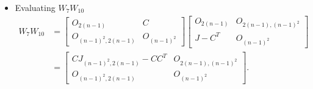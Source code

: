 \begin{itemize}
    \item Evaluating $W_7W_{10}$
    \begin{align*}
        W_7W_{10}
        &= \begin{bmatrix}
            O_{2(n-1)} & C \\
            O_{(n-1)^2, 2(n-1)} & O_{(n-1)^2}
        \end{bmatrix}\begin{bmatrix}
            O_{2(n-1)} & O_{2(n-1),(n-1)^2} \\
            J-C^T & O_{(n-1)^2}
        \end{bmatrix}\\
        &= \begin{bmatrix}
            CJ_{(n-1)^2,2(n-1)} - CC^T & O_{2(n-1),(n-1)^2} \\
            O_{(n-1)^2, 2(n-1)} & O_{(n-1)^2}
        \end{bmatrix}.
    \end{align*}


\end{itemize}
